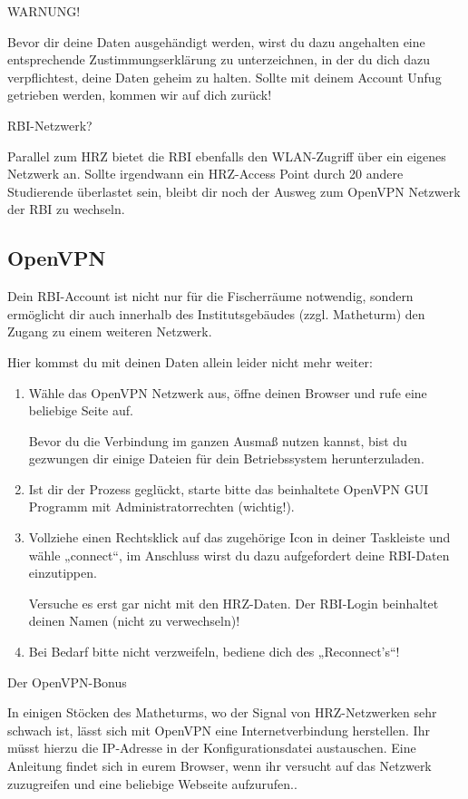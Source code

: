 \begin{fancyblock}{WARNUNG!}

Bevor dir deine Daten ausgehändigt werden, wirst du dazu angehalten eine entsprechende
Zustimmungserklärung zu unterzeichnen, in der du dich dazu verpflichtest, deine Daten geheim zu halten. Sollte mit
deinem Account Unfug getrieben werden, kommen wir auf dich zurück!
\end{fancyblock}

\begin{fancyblock}{RBI-Netzwerk?}

Parallel zum HRZ bietet die RBI ebenfalls  den WLAN-Zugriff über ein eigenes Netzwerk an.
Sollte irgendwann ein HRZ-Access Point durch 20 andere Studierende überlastet sein, bleibt dir noch
der Ausweg zum OpenVPN Netzwerk der RBI zu wechseln.
\end{fancyblock}

\subsection*{OpenVPN}

Dein RBI-Account ist nicht nur für die Fischerräume notwendig, sondern ermöglicht dir auch innerhalb des
Institutsgebäudes (zzgl. Matheturm) den Zugang zu einem weiteren Netzwerk.

Hier kommst du mit deinen Daten allein leider nicht mehr weiter:
\begin{enumerate}
	\item Wähle das OpenVPN Netzwerk aus, öffne deinen Browser und rufe eine beliebige Seite auf.

	Bevor du die Verbindung im ganzen Ausmaß nutzen kannst, bist du gezwungen dir einige Dateien für dein Betriebssystem herunterzuladen.
	\item Ist dir der Prozess geglückt, starte bitte das beinhaltete OpenVPN GUI Programm mit Administratorrechten (wichtig!).
	\item Vollziehe einen Rechtsklick auf das zugehörige Icon in deiner Taskleiste und wähle „connect“, im Anschluss wirst du dazu aufgefordert
	deine RBI-Daten einzutippen.

	Versuche es erst gar nicht mit den HRZ-Daten. Der RBI-Login beinhaltet deinen Namen (nicht	zu verwechseln)!
	\item  Bei Bedarf bitte nicht verzweifeln, bediene dich des „Reconnect's“!
\end{enumerate}

\begin{fancyblock}{Der OpenVPN-Bonus}

In einigen Stöcken des Matheturms, wo der Signal von HRZ-Netzwerken sehr schwach ist,
lässt sich mit OpenVPN eine Internetverbindung herstellen. Ihr müsst hierzu die IP-Adresse in der Konfigurationsdatei
austauschen. Eine Anleitung findet sich in eurem Browser, wenn ihr versucht auf das Netzwerk zuzugreifen und eine
beliebige Webseite aufzurufen..
\end{fancyblock}

